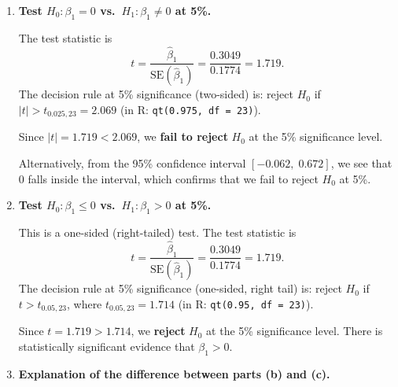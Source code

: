 \documentclass[12pt]{article}
\begin{document}
\begin{enumerate}
\begin{enumerate}
\textbf{C and D (95\% confidence interval):} The 95\% confidence interval for $\beta_1$ is
$$
\hat{\beta}_1 \pm t_{0.025, 23} \cdot \text{SE}(\hat{\beta}_1),
$$
where $t_{0.025, 23} = 2.069$ (in R: \verb!qt(0.975, df = 23)!). Substituting:
\begin{align*}
\text{Lower bound (C)} &= 0.3049 - 2.069 \times 0.1774 \\
&= 0.3049 - 0.3670 \\
&= -0.062.
\end{align*}
\begin{align*}
\text{Upper bound (D)} &= 0.3049 + 2.069 \times 0.1774 \\
&= 0.3049 + 0.3670 \\
&= 0.672.
\end{align*}
Therefore $\mathbf{C = -0.062}$ and $\mathbf{D = 0.672}$.

\bigskip

\item \textbf{Test $H_0\colon \beta_1 = 0$ vs.\ $H_1\colon \beta_1 \ne 0$ at 5\%.}

The test statistic is
$$
t = \frac{\hat{\beta}_1}{\text{SE}(\hat{\beta}_1)} = \frac{0.3049}{0.1774} = 1.719.
$$
The decision rule at 5\% significance (two-sided) is: reject $H_0$ if $|t| > t_{0.025, 23} = 2.069$ (in R: \verb!qt(0.975, df = 23)!).

Since $|t| = 1.719 < 2.069$, we \textbf{fail to reject} $H_0$ at the 5\% significance level.

Alternatively, from the 95\% confidence interval $[-0.062,\; 0.672]$, we see that $0$ falls inside the interval, which confirms that we fail to reject $H_0$ at 5\%.

\bigskip

\item \textbf{Test $H_0\colon \beta_1 \le 0$ vs.\ $H_1\colon \beta_1 > 0$ at 5\%.}

This is a one-sided (right-tailed) test. The test statistic is
$$
t = \frac{\hat{\beta}_1}{\text{SE}(\hat{\beta}_1)} = \frac{0.3049}{0.1774} = 1.719.
$$
The decision rule at 5\% significance (one-sided, right tail) is: reject $H_0$ if $t > t_{0.05, 23}$, where $t_{0.05, 23} = 1.714$ (in R: \verb!qt(0.95, df = 23)!).

Since $t = 1.719 > 1.714$, we \textbf{reject} $H_0$ at the 5\% significance level. There is statistically significant evidence that $\beta_1 > 0$.

\bigskip

\item \textbf{Explanation of the difference between parts (b) and (c).}


\end{enumerate}
\end{enumerate}
\end{document}
